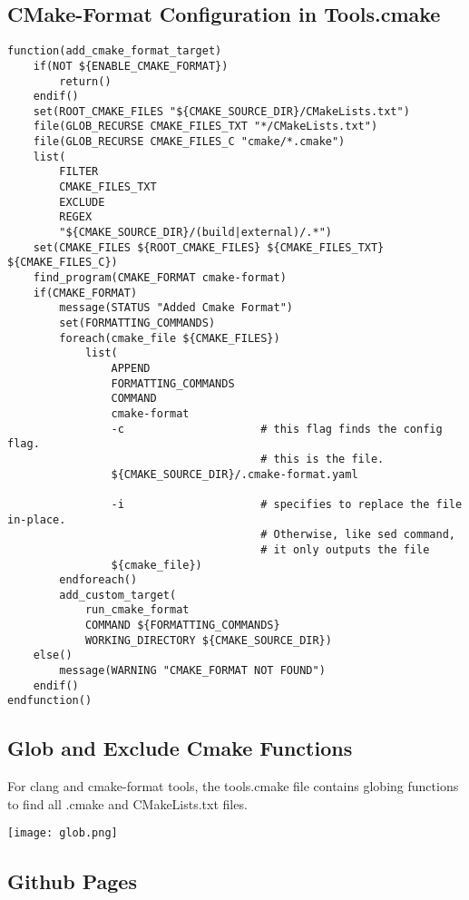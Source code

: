 \subsection{CMake-Format Configuration in Tools.cmake}


\begin{verbatim}
function(add_cmake_format_target)
    if(NOT ${ENABLE_CMAKE_FORMAT})
        return()
    endif()
    set(ROOT_CMAKE_FILES "${CMAKE_SOURCE_DIR}/CMakeLists.txt")
    file(GLOB_RECURSE CMAKE_FILES_TXT "*/CMakeLists.txt")
    file(GLOB_RECURSE CMAKE_FILES_C "cmake/*.cmake")
    list(
        FILTER
        CMAKE_FILES_TXT
        EXCLUDE
        REGEX
        "${CMAKE_SOURCE_DIR}/(build|external)/.*")
    set(CMAKE_FILES ${ROOT_CMAKE_FILES} ${CMAKE_FILES_TXT} ${CMAKE_FILES_C})
    find_program(CMAKE_FORMAT cmake-format)
    if(CMAKE_FORMAT)
        message(STATUS "Added Cmake Format")
        set(FORMATTING_COMMANDS)
        foreach(cmake_file ${CMAKE_FILES})
            list(
                APPEND
                FORMATTING_COMMANDS
                COMMAND
                cmake-format
                -c                     # this flag finds the config flag. 
                                       # this is the file.
                ${CMAKE_SOURCE_DIR}/.cmake-format.yaml

                -i                     # specifies to replace the file in-place.
                                       # Otherwise, like sed command,
                                       # it only outputs the file
                ${cmake_file})
        endforeach()
        add_custom_target(
            run_cmake_format
            COMMAND ${FORMATTING_COMMANDS}
            WORKING_DIRECTORY ${CMAKE_SOURCE_DIR})
    else()
        message(WARNING "CMAKE_FORMAT NOT FOUND")
    endif()
endfunction()
\end{verbatim}

\subsection{Glob and Exclude Cmake Functions}

For clang and cmake-format tools, the tools.cmake file contains globing functions to
find all .cmake and CMakeLists.txt files.


\begin{center}
    \texttt{[image: glob.png]}
\end{center}

\subsection{Github Pages}

